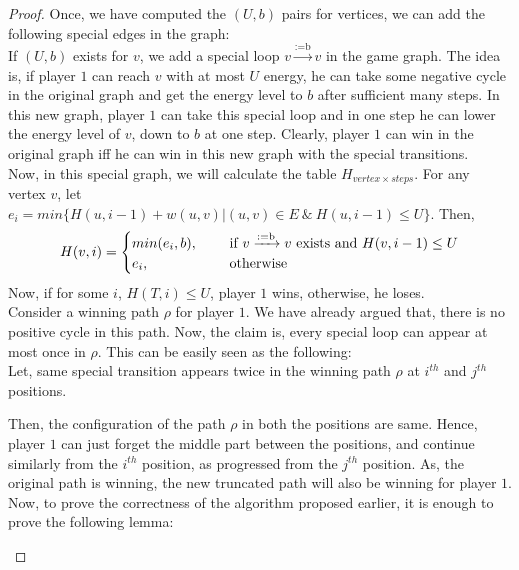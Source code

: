 \begin{proof}
  \vskip 0.1cm
  Once, we have computed the $(U,b)$ pairs for vertices, we can add the following special edges in the graph:\\
  If $(U,b)$ exists for $v$, we add a special loop $v \xrightarrow{\text{:=b}} v$ in the game graph. The idea is, if player $1$ can reach $v$ with at most $U$ energy, he can take some negative cycle in the original graph and get the energy level to $b$ after sufficient many steps. In this new graph, player $1$ can take this special loop and in one step he can lower the energy level of $v$, down to $b$ at one step. Clearly, player $1$ can win in the original graph iff he can win in this new graph with the special transitions.\\
  Now, in this special graph, we will calculate the table $H_{vertex \times steps}$. For any vertex $v$, let \\$e_i=min\{H(u,i-1) + w(u,v) | (u,v)\in E\  \&\  H(u,i-1) \leq U\}$. Then,
   $$
   H(v,i)=
   \begin{cases}
    min(e_i,b), \hskip 0.5cm &\text{if $v \xrightarrow{\text{:=b}} v$ exists and
    $H(v,i-1) \leq U$}\\ 
   e_i, \hskip 1cm &\text{otherwise}
 \end{cases}
 $$
 Now, if for some $i$, $H(T,i)\leq U$, player $1$ wins, otherwise, he loses.\\
 \vskip 0.1cm
 Consider a winning path $\rho$ for player $1$. We have already argued that, there is no positive cycle in this path. Now, the claim is, every special loop can appear at most once in $\rho$. This can be easily seen as the following:\\
 Let, same special transition appears twice in the winning path $\rho$ at $i^{th}$ and $j^{th}$ positions.\\
 \begin{figure}[htb]
 \hskip 2cm
 
 \end{figure}
 \vskip 0.1cm
 Then, the configuration of the path $\rho$ in both the positions are same. Hence, player $1$ can just forget the middle part between the positions, and continue similarly from the $i^{th}$ position, as progressed from the $j^{th}$ position. As, the original path is winning, the new truncated path will also be winning for player $1$.\\
 Now, to prove the correctness of the algorithm proposed earlier, it is enough to prove the following lemma:\\
 \vskip 0.1cm
 \begin{lemma}

\end{lemma}
\end{proof}
